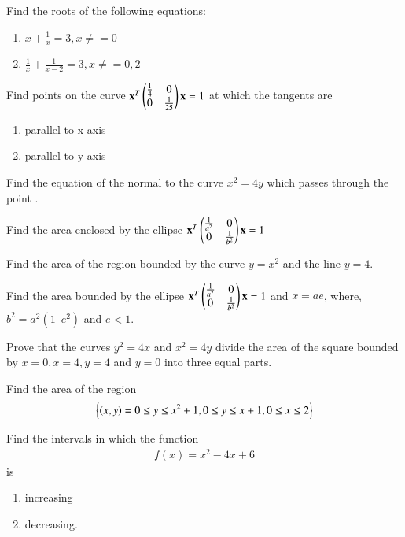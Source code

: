 \item Find the roots of the following equations:
\begin{enumerate}
\item  $x + \frac{1}{x} = 3, x \ne =0 $
\item  $ \frac{1}{x} + \frac{1}{x-2}=3, x\ne =0, 2 $
\end{enumerate}
%
\item Find points on the curve 
$
\mathbf{x}^T\begin{pmatrix}\frac{1}{4} & 0 \\ 0 & \frac{1}{25}\end{pmatrix}\mathbf{x} = 1
$
at which the tangents are 
\begin{enumerate}
\item parallel to x-axis
\item parallel to y-axis
\end{enumerate}
 \item Find the equation of the normal to the curve $x^2= 4y$
which passes through the point .
%
\solution

%
\item Find the area enclosed by the ellipse
$
\mathbf{x}^T\begin{pmatrix}\frac{1}{a^2} & 0 \\ 0 & \frac{1}{b^2}\end{pmatrix}\mathbf{x} = 1
$
%
\item Find the area of the region bounded by the curve $y = x^2$
and the line $y = 4$.
%
\item Find the area bounded by the ellipse
$
\mathbf{x}^T\begin{pmatrix}\frac{1}{a^2} & 0 \\ 0 & \frac{1}{b^2}\end{pmatrix}\mathbf{x} = 1
$
and $x = ae$, where, $b^2 = a^2 (1 – e^2 )$ and $e < 1$.
%
\item Prove that the curves $y^2 = 4x$ and $x^2 = 4y$ divide the area of the square bounded by $x = 0, x = 4, y =4$ and $y = 0$ into three equal parts.
%
\item Find the area of the region
\begin{align}
\left\{\left(x,y\right) = 0\le y\le x^2+1, 0\le y \le x+1, 0 \le x \le 2\right\}
\end{align}
\item Find the intervals in which the function 
\begin{align}
f(x)  = x^2-4x+6
\end{align}
%
is 
\begin{enumerate}
\item increasing
\item decreasing.
\end{enumerate}
%
